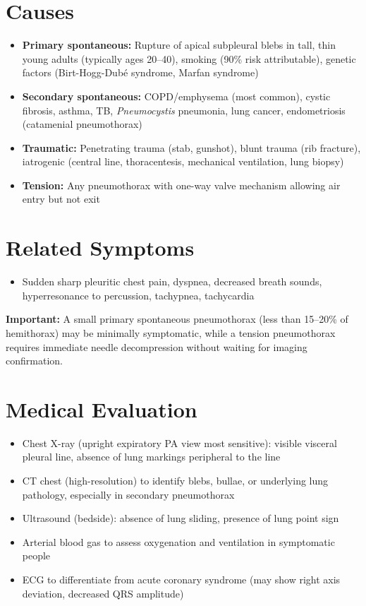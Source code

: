 \section*{Causes}
\begin{itemize}
  \item \textbf{Primary spontaneous:} Rupture of apical subpleural blebs in tall, thin young adults (typically ages 20--40), smoking (90\% risk attributable), genetic factors (Birt-Hogg-Dub\'e syndrome, Marfan syndrome)
  \item \textbf{Secondary spontaneous:} COPD/emphysema (most common), cystic fibrosis, asthma, TB, \textit{Pneumocystis} pneumonia, lung cancer, endometriosis (catamenial pneumothorax)
  \item \textbf{Traumatic:} Penetrating trauma (stab, gunshot), blunt trauma (rib fracture), iatrogenic (central line, thoracentesis, mechanical ventilation, lung biopsy)
  \item \textbf{Tension:} Any pneumothorax with one-way valve mechanism allowing air entry but not exit
\end{itemize}

\section*{Related Symptoms}
\begin{itemize}
  \item Sudden sharp pleuritic chest pain, dyspnea, decreased breath sounds, hyperresonance to percussion, tachypnea, tachycardia
\end{itemize}
\textbf{Important:} A small primary spontaneous pneumothorax (less than 15--20\% of hemithorax) may be minimally symptomatic, while a tension pneumothorax requires immediate needle decompression without waiting for imaging confirmation.

\section*{Medical Evaluation}
\begin{itemize}
  \item Chest X-ray (upright expiratory PA view most sensitive): visible visceral pleural line, absence of lung markings peripheral to the line
  \item CT chest (high-resolution) to identify blebs, bullae, or underlying lung pathology, especially in secondary pneumothorax
  \item Ultrasound (bedside): absence of lung sliding, presence of lung point sign
  \item Arterial blood gas to assess oxygenation and ventilation in symptomatic people
  \item ECG to differentiate from acute coronary syndrome (may show right axis deviation, decreased QRS amplitude)
\end{itemize}

